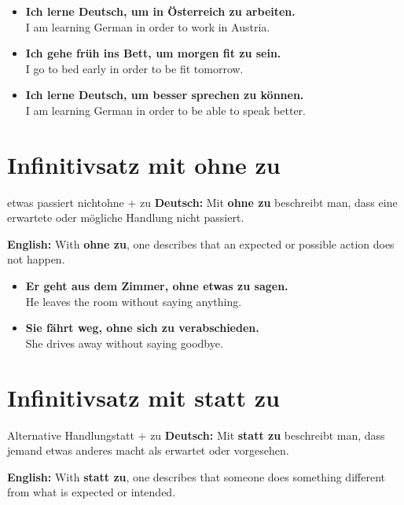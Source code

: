\documentclass[a4paper,11pt]{article}
\newcommand{\GermanText}[1]{\textbf{Deutsch: }#1\par}
\newcommand{\EnglishText}[1]{{\small\color{SoftGray}\textbf{English: }#1\par}}
\newcommand{\ExampleItem}[2]{\item \textbf{#1}\\{\small\color{SoftGray}#2}}
\begin{document}
        \begin{exbox}
            \begin{itemize}
                \ExampleItem{Ich lerne Deutsch, um in Österreich zu arbeiten.}{I am learning German in order to work in Austria.}
                \ExampleItem{Ich gehe früh ins Bett, um morgen fit zu sein.}{I go to bed early in order to be fit tomorrow.}
                \ExampleItem{Ich lerne Deutsch, um besser sprechen zu können.}{I am learning German in order to be able to speak better.}
            \end{itemize}
        \end{exbox}


    \section{Infinitivsatz mit \glqq ohne zu\grqq}

        \begin{grammarentry}{etwas passiert nicht}{ohne + zu}
            \GermanText{Mit \textbf{ohne zu} beschreibt man, dass eine erwartete oder mögliche Handlung nicht passiert.}
            \EnglishText{With \textbf{ohne zu}, one describes that an expected or possible action does not happen.}
        \end{grammarentry}

        \begin{exbox}
            \begin{itemize}
                \ExampleItem{Er geht aus dem Zimmer, ohne etwas zu sagen.}{He leaves the room without saying anything.}
                \ExampleItem{Sie fährt weg, ohne sich zu verabschieden.}{She drives away without saying goodbye.}
            \end{itemize}
        \end{exbox}


    \section{Infinitivsatz mit \glqq statt zu\grqq}

        \begin{grammarentry}{Alternative Handlung}{statt + zu}
            \GermanText{Mit \textbf{statt zu} beschreibt man, dass jemand etwas anderes macht als erwartet oder vorgesehen.}
            \EnglishText{With \textbf{statt zu}, one describes that someone does something different from what is expected or intended.}
        \end{grammarentry}
\end{document}
